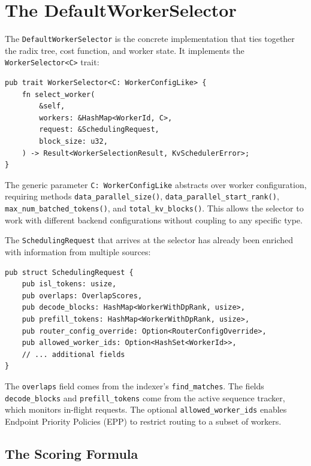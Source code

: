 \section{The DefaultWorkerSelector}
\label{sec:kvrouter:selector}

%
The \texttt{DefaultWorkerSelector} is the concrete implementation that ties together the radix tree, cost function, and worker state. It implements the \texttt{WorkerSelector<C>} trait:

\begin{verbatim}
pub trait WorkerSelector<C: WorkerConfigLike> {
    fn select_worker(
        &self,
        workers: &HashMap<WorkerId, C>,
        request: &SchedulingRequest,
        block_size: u32,
    ) -> Result<WorkerSelectionResult, KvSchedulerError>;
}
\end{verbatim}

The generic parameter \texttt{C: WorkerConfigLike} abstracts over worker configuration, requiring methods \texttt{data\_parallel\_size()}, \texttt{data\_parallel\_start\_rank()}, \texttt{max\_num\_batched\_tokens()}, and \texttt{total\_kv\_blocks()}. This allows the selector to work with different backend configurations without coupling to any specific type.

The \texttt{SchedulingRequest} that arrives at the selector has already been enriched with information from multiple sources:

\begin{verbatim}
pub struct SchedulingRequest {
    pub isl_tokens: usize,
    pub overlaps: OverlapScores,
    pub decode_blocks: HashMap<WorkerWithDpRank, usize>,
    pub prefill_tokens: HashMap<WorkerWithDpRank, usize>,
    pub router_config_override: Option<RouterConfigOverride>,
    pub allowed_worker_ids: Option<HashSet<WorkerId>>,
    // ... additional fields
}
\end{verbatim}

The \texttt{overlaps} field comes from the indexer's \texttt{find\_matches}. The fields \texttt{decode\_blocks} and \texttt{prefill\_tokens} come from the active sequence tracker, which monitors in-flight requests. The optional \texttt{allowed\_\allowbreak worker\_ids} enables Endpoint Priority Policies (EPP) to restrict routing to a subset of workers.

\subsection{The Scoring Formula}

